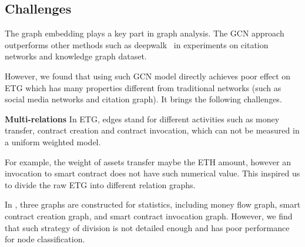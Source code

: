 \subsection{Challenges}
\label{section:time}
The graph embedding plays a key part in graph analysis. The GCN approach \cite{kipf2016semi} outperforms other methods such as deepwalk~\cite{perozzi2014deepwalk} in experiments on citation networks and knowledge graph dataset.

However, we found that using such GCN model directly achieves poor effect on ETG which has many properties different from traditional networks (such as social media networks and citation graph). It brings the following challenges.


\textbf{Multi-relations} In ETG, edges stand for different activities such as money transfer, contract creation and contract invocation, which can not be measured in a uniform weighted model.

For example, the weight of assets transfer maybe the ETH amount, however an invocation to smart contract does not have such numerical value. This inspired us to divide the raw ETG into different relation graphs.

In \cite{chen2018infocom}, three graphs are constructed for statistics, including money flow graph, smart contract creation graph, and smart contract invocation graph. However, we find that such strategy of division is not detailed enough and has poor performance for node classification.





